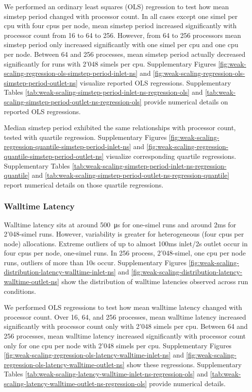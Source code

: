We performed an ordinary least squares (OLS) regression to test how mean simstep period changed with processor count.
In all cases except one simel per cpu with four cpus per node, mean simstep period increased significantly with processor count from 16 to 64 to 256.
However, from 64 to 256 processors mean simstep period only increased significantly with one simel per cpu and one cpu per node.
Between 64 and 256 processes, mean simstep period actually decreased significantly for runs with 2'048 simels per cpu.
Supplementary Figures \ref{fig:weak-scaling-regression-ols-simstep-period-inlet-ns} and \ref{fig:weak-scaling-regression-ols-simstep-period-outlet-ns} visualize reported OLS regressions.
Supplementary Tables \ref{tab:weak-scaling-simstep-period-inlet-ns-regression-ols} and \ref{tab:weak-scaling-simstep-period-outlet-ns-regression-ols} provide numerical details on reported OLS regressions.

Median simstep period exhibited the same relationships with processor count, tested with quartile regression.
Supplementary Figures \ref{fig:weak-scaling-regression-quantile-simstep-period-inlet-ns} and \ref{fig:weak-scaling-regression-quantile-simstep-period-outlet-ns} visualize corresponding quartile regressions.
Supplementary Tables \ref{tab:weak-scaling-simstep-period-inlet-ns-regression-quantile} and \ref{tab:weak-scaling-simstep-period-outlet-ns-regression-quantile} report numerical details on those quartile regressions.

\subsubsection{Walltime Latency}

Walltime latency sits at around \SI{500}{\micro\second} for one-simel runs and around 2ms for 2'048-simel runs.
However, variability is greater for heterogeneous (four cpus per node) allocations.
Extreme outliers of up to almost 100ms inlet/2s outlet occur in four cpus per node, one-simel runs.
In 256 process, 2'048-simel, one cpu per node runs, outliers of more than 10s occur.
Supplementary Figures \ref{fig:weak-scaling-distribution-latency-walltime-inlet-ns} and \ref{fig:weak-scaling-distribution-latency-walltime-outlet-ns} show the distribution of walltime latencies observed across run conditions.

We performed OLS regressions to test how mean walltime latency changed with processor count.
Over 16, 64, and 256 processes, mean walltime latency increased significantly with processor count only with 2'048 simels per cpu.
Between 64 and 256 processes, mean walltime latency increased significantly with processor count only for one cpu per node with 2'048 simels per cpu.
Supplementary Figures \ref{fig:weak-scaling-regression-ols-latency-walltime-inlet-ns} and \ref{fig:weak-scaling-regression-ols-latency-walltime-outlet-ns} show these regressions.
Supplementary Tables \ref{tab:weak-scaling-latency-walltime-inlet-ns-regression-ols} and \ref{tab:weak-scaling-latency-walltime-outlet-ns-regression-ols} provide numerical details.

